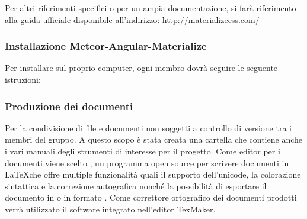 \documentclass[a4paper,11pt]{article}
\begin{document}
			
			Per altri riferimenti specifici o per un ampia documentazione, si farà riferimento alla guida ufficiale disponibile all'indirizzo: \url{http://materializecss.com/}
			
			\subsubsection{ Installazione Meteor-Angular-Materialize}
			Per installare  sul proprio computer, ogni membro dovrà seguire le seguente istruzioni:
			
			
			
			
			
	\subsubsection{Produzione dei documenti} \label{doc:prodoc}
	
	Per la condivisione di file e documenti non soggetti a controllo di versione tra i membri del gruppo. A questo scopo è stata creata una cartella che contiene anche i vari  manuali degli strumenti di interesse per il progetto.
	Come editor per i documenti viene scelto , un programma open source per scrivere documenti in \LaTeX   che offre multiple funzionalità quali il supporto dell'unicode, la colorazione sintattica e la correzione autografica nonché la possibilità di esportare il documento in  o in formato .
	Come correttore ortografico dei documenti prodotti verrà utilizzato il software \textbf{} integrato nell'editor TexMaker.
	\newpage
	
		
	
\end{document}
